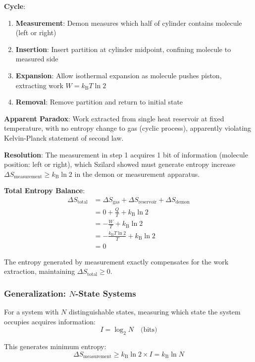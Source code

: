 \documentclass[11pt,a4paper]{article}
\newcommand{\kB}{k_\text{B}}
\begin{document}
\textbf{Cycle}:
\begin{enumerate}
\item \textbf{Measurement}: Demon measures which half of cylinder contains molecule (left or right)
\item \textbf{Insertion}: Insert partition at cylinder midpoint, confining molecule to measured side
\item \textbf{Expansion}: Allow isothermal expansion as molecule pushes piston, extracting work $W = \kB T \ln 2$
\item \textbf{Removal}: Remove partition and return to initial state
\end{enumerate}

\textbf{Apparent Paradox}: Work extracted from single heat reservoir at fixed temperature, with no entropy change to gas (cyclic process), apparently violating Kelvin-Planck statement of second law.

\textbf{Resolution}: The measurement in step 1 acquires 1 bit of information (molecule position: left or right), which Szilard showed must generate entropy increase $\Delta S_{\text{measurement}} \geq \kB \ln 2$ in the demon or measurement apparatus.

\textbf{Total Entropy Balance}:
\begin{align}
\Delta S_{\text{total}} &= \Delta S_{\text{gas}} + \Delta S_{\text{reservoir}} + \Delta S_{\text{demon}} \\
&= 0 + \frac{Q}{T} + \kB \ln 2 \\
&= -\frac{W}{T} + \kB \ln 2 \\
&= -\frac{\kB T \ln 2}{T} + \kB \ln 2 \\
&= 0
\end{align}

The entropy generated by measurement exactly compensates for the work extraction, maintaining $\Delta S_{\text{total}} \geq 0$.

\subsubsection{Generalization: $N$-State Systems}

For a system with $N$ distinguishable states, measuring which state the system occupies acquires information:
\begin{equation}
I = \log_2 N \quad \text{(bits)}
\end{equation}

This generates minimum entropy:
\begin{equation}
\Delta S_{\text{measurement}} \geq \kB \ln 2 \times I = \kB \ln N
\end{equation}
\end{document}
